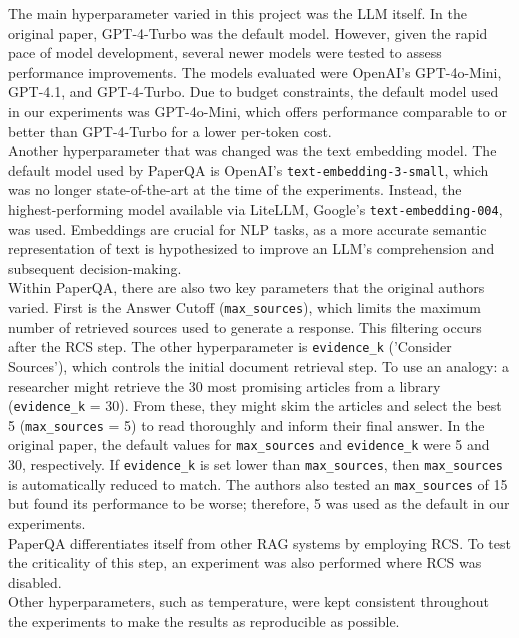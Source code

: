 The main hyperparameter varied in this project was the LLM itself. In the original paper, GPT-4-Turbo was the default model. However, given the rapid pace of model development, several newer models were tested to assess performance improvements. The models evaluated were OpenAI's GPT-4o-Mini, GPT-4.1, and GPT-4-Turbo. Due to budget constraints, the default model used in our experiments was GPT-4o-Mini, which offers performance comparable to or better than GPT-4-Turbo for a lower per-token cost.\\

Another hyperparameter that was changed was the text embedding model. The default model used by PaperQA is OpenAI's \texttt{text-embedding-3-small}, which was no longer state-of-the-art at the time of the experiments. Instead, the highest-performing model available via LiteLLM, Google's \texttt{text-embedding-004}, was used. Embeddings are crucial for NLP tasks, as a more accurate semantic representation of text is hypothesized to improve an LLM's comprehension and subsequent decision-making. \\

Within PaperQA, there are also two key parameters that the original authors varied. First is the Answer Cutoff (\texttt{max\_sources}), which limits the maximum number of retrieved sources used to generate a response. This filtering occurs after the RCS step. The other hyperparameter is \texttt{evidence\_k} ('Consider Sources'), which controls the initial document retrieval step. To use an analogy: a researcher might retrieve the 30 most promising articles from a library (\texttt{evidence\_k} = 30). From these, they might skim the articles and select the best 5 (\texttt{max\_sources} = 5) to read thoroughly and inform their final answer. In the original paper, the default values for \texttt{max\_sources} and \texttt{evidence\_k} were 5 and 30, respectively. If \texttt{evidence\_k} is set lower than \texttt{max\_sources}, then \texttt{max\_sources} is automatically reduced to match. The authors also tested an \texttt{max\_sources} of 15 but found its performance to be worse; therefore, 5 was used as the default in our experiments.\\

PaperQA differentiates itself from other RAG systems by employing RCS. To test the criticality of this step, an experiment was also performed where RCS was disabled. \\

Other hyperparameters, such as temperature, were kept consistent throughout the experiments to make the results as reproducible as possible. \\


